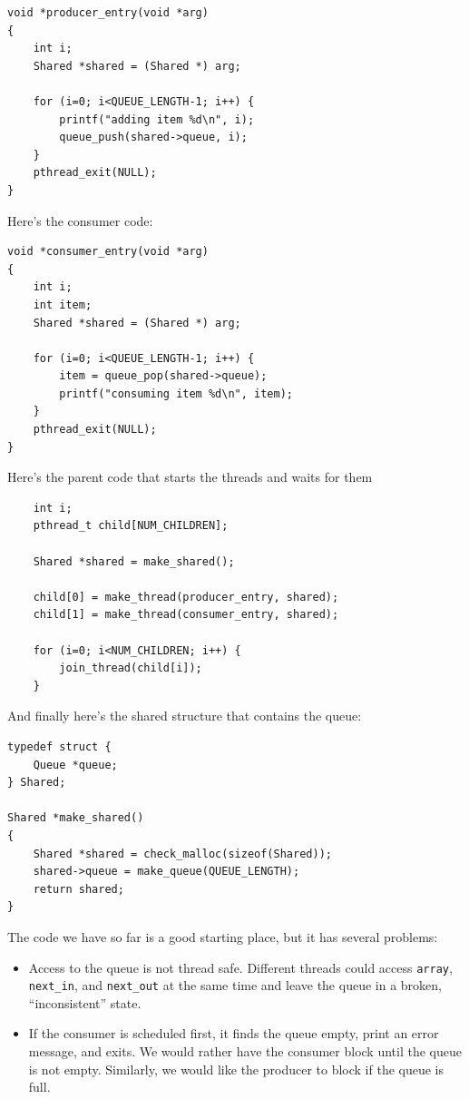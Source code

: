 \documentclass[12pt]{book}
\begin{document}
\begin{verbatim}
void *producer_entry(void *arg)
{
    int i;
    Shared *shared = (Shared *) arg;

    for (i=0; i<QUEUE_LENGTH-1; i++) {
        printf("adding item %d\n", i);
        queue_push(shared->queue, i);
    }
    pthread_exit(NULL);
}
\end{verbatim}

Here's the consumer code:

\begin{verbatim}
void *consumer_entry(void *arg)
{
    int i;
    int item;
    Shared *shared = (Shared *) arg;

    for (i=0; i<QUEUE_LENGTH-1; i++) {
        item = queue_pop(shared->queue);
        printf("consuming item %d\n", item);
    }
    pthread_exit(NULL);
}
\end{verbatim}


Here's the parent code that starts the threads and waits for them

\begin{verbatim}
    int i;
    pthread_t child[NUM_CHILDREN];

    Shared *shared = make_shared();

    child[0] = make_thread(producer_entry, shared);
    child[1] = make_thread(consumer_entry, shared);

    for (i=0; i<NUM_CHILDREN; i++) {
        join_thread(child[i]);
    }
\end{verbatim}

And finally here's the shared structure that contains the queue:

\begin{verbatim}
typedef struct {
    Queue *queue;
} Shared;

Shared *make_shared()
{
    Shared *shared = check_malloc(sizeof(Shared));
    shared->queue = make_queue(QUEUE_LENGTH);
    return shared;
}
\end{verbatim}

The code we have so far is a good starting place, but it has
several problems:

\begin{itemize}

\item Access to the queue is not thread safe.  Different threads
could access {\tt array}, \verb"next_in", and \verb"next_out"
at the same time and leave the queue in a broken, ``inconsistent''
state.

\item If the consumer is scheduled first, it finds the queue empty,
print an error message, and exits.  We would rather have the consumer
block until the queue is not empty.  Similarly, we would like the
producer to block if the queue is full.

\end{itemize}
\end{document}
